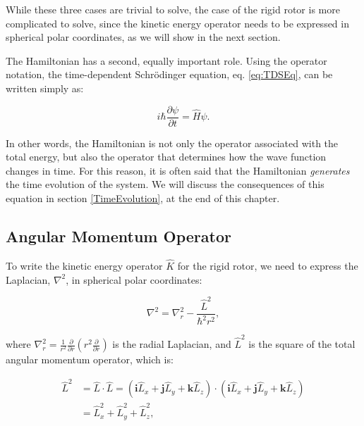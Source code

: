 \documentclass[
  english,
  9pt,
]{extbook}
\theoremstyle{definition}
\theoremstyle{definition}
\theoremstyle{definition}
\theoremstyle{definition}
\theoremstyle{remark}
\begin{document}
While these three cases are trivial to solve, the case of the rigid rotor is more complicated to solve, since the kinetic energy operator needs to be expressed in spherical polar coordinates, as we will show in the next section.

The Hamiltonian has a second, equally important role. Using the operator notation, the time-dependent Schrödinger equation, eq. \eqref{eq:TDSEq}, can be written simply as:

\begin{equation}
i\hbar\frac{\partial \psi}{\partial t} = \hat{H}\psi.
\label{eq:tdseqop}  
\end{equation}

In other words, the Hamiltonian is not only the operator associated with the total energy, but also the operator that determines how the wave function changes in time. For this reason, it is often said that the Hamiltonian \emph{generates} the time evolution of the system. We will discuss the consequences of this equation in section \ref{TimeEvolution}, at the end of this chapter.

\subsection{Angular Momentum Operator}\label{angular-momentum-operator}

To write the kinetic energy operator \(\hat{K}\) for the rigid rotor, we need to express the Laplacian, \(\nabla^2\), in spherical polar coordinates:

\begin{equation}
\nabla^2=\nabla^2_r - \frac{\hat{L}^2}{\hbar^2 r^2},
\label{eq:angmom1}  
\end{equation}

where \(\nabla_r^2 = \frac{1}{r^2}\frac{\partial}{\partial r} \left( r^2\frac{\partial}{\partial r} \right)\) is the radial Laplacian, and \(\hat{L}^2\) is the square of the total angular momentum operator, which is:

\begin{equation}
\begin{aligned}
\hat{L}^2 &=\hat{L}\cdot\hat{L}=\left(\mathbf{i}\hat{L}_x+\mathbf{j}\hat{L}_y+\mathbf{k}\hat{L}_z\right)\cdot\left(\mathbf{i}\hat{L}_x+\mathbf{j}\hat{L}_y+\mathbf{k}\hat{L}_z \right) \\
&=\hat{L}_x^2+\hat{L}_y^2+\hat{L}_z^2,
\end{aligned}
\label{eq:angmom1b}    
\end{equation}
\end{document}
